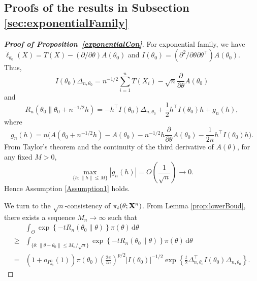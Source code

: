 \documentclass[11pt]{article}
\newcommand{\myT}{\intercal}
\theoremstyle{plain}
\theoremstyle{definition}
\theoremstyle{remark}
\begin{document}
\begin{appendices}
\subsection{Proofs of the results in Subsection \ref{sec:exponentialFamily}}
\begin{proof}[\textbf{Proof of Proposition~\ref{exponentialCon}}]
    For exponential family, we have $\dot{\ell}_{\theta_0} (X) = T(X) - ( \partial / \partial \theta ) A(\theta_0)$ and $I(\theta_0) = (\partial^2 /\partial \theta \partial \theta^\myT ) A(\theta_0)$.
    Thus,
    $$
    I(\theta_0)\Delta_{n,\theta_0}=n^{-1/2}\sum_{i=1}^n T(X_i)-\sqrt{n}\frac{\partial}{\partial \theta} A(\theta_0)
    $$
    and
    $$
    R_n ( \theta_0 \| \theta_0 + n^{-1/2}h  )
    =-h^\myT  I(\theta_0) \Delta_{n,\theta_0}+\frac{1}{2} h^\myT  I(\theta_0) h +
    g_n(h),
    $$
    where
    $$
    g_n(h)=n\Big(A(\theta_0+n^{-1/2}h)-A(\theta_0)-n^{-1/2}h \frac{\partial}{\partial \theta}A(\theta_0)-\frac{1}{2n}h^\myT  I(\theta_0) h\Big).
    $$
    From Taylor's theorem and the continuity of the third derivative of $A(\theta)$, 
    for any fixed $M>0$,
    $$
        \max_{\{h:\|h\|\leq M\}}|g_n(h)|=O\left(\frac{1}{\sqrt{n}}\right)\to 0.
    $$
    Hence Assumption \ref{Assumption1} holds.

    We turn to the $\sqrt n$-consistency of $\pi_t(\theta; \mathbf{X}^n)$.
    From Lemma \ref{prop:lowerBoud},
    there exists a sequence $M_n \to \infty$ such that
    \begin{equation}\label{yaotou1}
    \begin{split}
&
    \int_{\Theta} \exp\left\{ -t R_n (\theta_0 \| \theta) \right\} \pi(\theta) \, \mathrm d \theta
    \\
    \geq &
    \int_{\{\theta:\|\theta-\theta_0\|\leq M_n/\sqrt{n}\}}
\exp\left\{ -t R_n (\theta_0 \| \theta) \right\}
     \pi(\theta)\, \mathrm d\theta
    \\
    =&
    (1+o_{P^n_{\theta_0}}(1))
        \pi(\theta_0)
    \left(\frac{2\pi}{t n}\right)^{p/2} |I(\theta_0)|^{-1/2}
    \exp\left\{ \frac{t}{2}\Delta_{n,\theta_0}^\myT  I(\theta_0)\Delta_{n,\theta_0} \right\}
    .
    \end{split}
\end{equation}


\end{proof}
\end{appendices}
\end{document}

